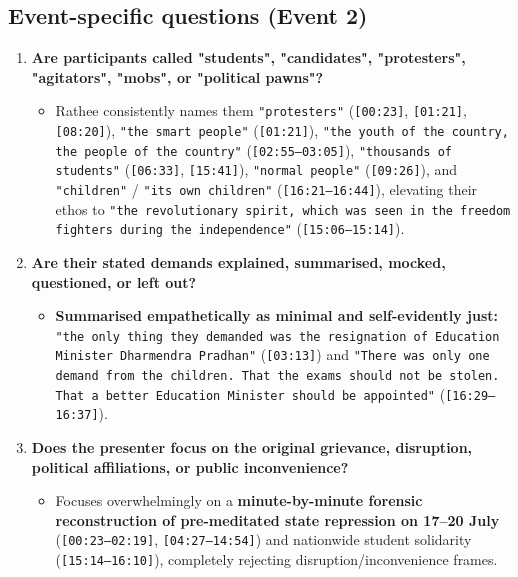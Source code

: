 \documentclass[10pt,a4paper]{article}
\begin{document}
\subsection*{Event-specific questions (Event 2)}
\begin{enumerate}[leftmargin=1.6em, itemsep=4pt, topsep=4pt]
  \item \textbf{Are participants called "students", "candidates", "protesters", "agitators", "mobs", or "political pawns"?}
  \begin{itemize}[leftmargin=1.4em, itemsep=2pt, topsep=2pt]
    \item Rathee consistently names them \texttt{"protesters"} (\texttt{[00:23]}, \texttt{[01:21]}, \texttt{[08:20]}), \texttt{"the smart people"} (\texttt{[01:21]}), \texttt{"the youth of the country, the people of the country"} (\texttt{[02:55--03:05]}), \texttt{"thousands of students"} (\texttt{[06:33]}, \texttt{[15:41]}), \texttt{"normal people"} (\texttt{[09:26]}), and \texttt{"children"} / \texttt{"its own children"} (\texttt{[16:21--16:44]}), elevating their ethos to \texttt{"the revolutionary spirit, which was seen in the freedom fighters during the independence"} (\texttt{[15:06--15:14]}).
  \end{itemize}
  \item \textbf{Are their stated demands explained, summarised, mocked, questioned, or left out?}
  \begin{itemize}[leftmargin=1.4em, itemsep=2pt, topsep=2pt]
    \item \textbf{Summarised empathetically as minimal and self-evidently just:} \texttt{"the only thing they demanded was the resignation of Education Minister Dharmendra Pradhan"} (\texttt{[03:13]}) and \texttt{"There was only one demand from the children. That the exams should not be stolen. That a better Education Minister should be appointed"} (\texttt{[16:29--16:37]}).
  \end{itemize}
  \item \textbf{Does the presenter focus on the original grievance, disruption, political affiliations, or public inconvenience?}
  \begin{itemize}[leftmargin=1.4em, itemsep=2pt, topsep=2pt]
    \item Focuses overwhelmingly on a \textbf{minute-by-minute forensic reconstruction of pre-meditated state repression on 17--20 July} (\texttt{[00:23--02:19]}, \texttt{[04:27--14:54]}) and nationwide student solidarity (\texttt{[15:14--16:10]}), completely rejecting disruption/inconvenience frames.

\end{itemize}
\end{enumerate}
\end{document}
